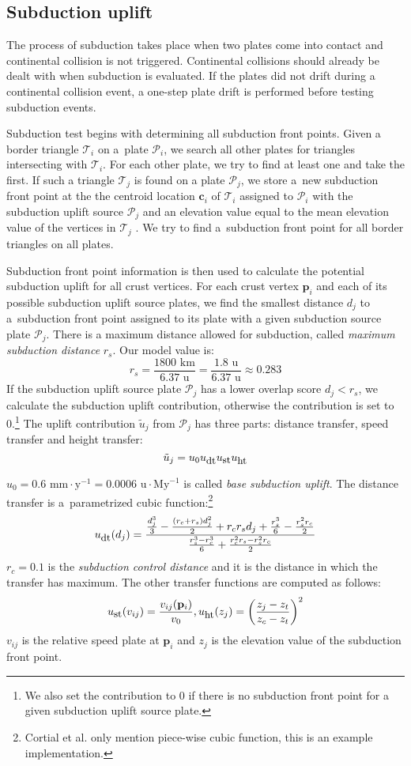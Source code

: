 \subsection{Subduction uplift}
The process of subduction takes place when two plates come into contact and continental collision is not triggered. Continental collisions should already be dealt with when subduction is evaluated. If the plates did not drift during a continental collision event, a one-step plate drift is performed before testing subduction events.

Subduction test begins with determining all subduction front points. Given a border triangle $\mathcal{T}_i$ on a~plate $\mathcal{P}_i$, we search all other plates for triangles intersecting with $\mathcal{T}_i$. For each other plate, we try to find at least one and take the first. If such a triangle $\mathcal{T}_j$ is found on a plate $\mathcal{P}_j$, we store a~new subduction front point at the the centroid location $\mathbf{c}_i$ of $\mathcal{T}_i$ assigned to $\mathcal{P}_i$ with the subduction uplift source $\mathcal{P}_j$ and an elevation value equal to the mean elevation value of the vertices in $\mathcal{T}_j$ . We try to find a~subduction front point for all border triangles on all plates.

Subduction front point information is then used to calculate the potential subduction uplift for all crust vertices. For each crust vertex $\mathbf{p}_i$ and each of its possible subduction uplift source plates, we find the smallest distance $d_j$ to a~subduction front point assigned to its plate with a given subduction source plate $\mathcal{P}_j$. There is a maximum distance allowed for subduction, called \textit{maximum subduction distance} $r_s$. Our model value is:
$$r_s=\frac{1800\mbox{ km}}{6.37\mbox{ u}}=\frac{1.8\mbox{ u}}{6.37\mbox{ u}}\approx0.283$$
If the subduction uplift source plate $\mathcal{P}_j$ has a lower overlap score $d_j<r_s$, we calculate the subduction uplift contribution, otherwise the contribution is set to 0.\footnote{We also set the contribution to 0 if there is no subduction front point for a given subduction uplift source plate.} The uplift contribution $\tilde{u}_j$ from $\mathcal{P}_j$ has three parts: distance transfer, speed transfer and height transfer:
$$ \tilde{u}_j=u_0 u_{\mbox{\small{dt}}}u_{\mbox{\small{st}}}u_{\mbox{\small{ht}}}$$

$u_0=0.6\mbox{ mm}\cdot\mbox{y}^{-1}=0.0006\mbox{ u}\cdot\mbox{My}^{-1}$ is called \textit{base subduction uplift}. The distance transfer is a~parametrized cubic function:\footnote{Cortial et al. only mention piece-wise cubic function, this is an example implementation.}
$$u_{\mbox{\small{dt}}}(d_j)=\frac{\frac{d_j^3}{3}-\frac{(r_c+r_s)d_j^2}{2}+r_cr_sd_j+\frac{r_s^3}{6}-\frac{r_s^2r_c}{2}}{\frac{r_s^3-r_c^3}{6}+\frac{r_c^2r_s-r_s^2r_c}{2}}$$
$r_c=0.1$ is the \textit{subduction control distance} and it is the distance in which the transfer has maximum. The other transfer functions are computed as follows:
$$u_{\mbox{\small{st}}}(v_{ij})=\frac{v_{ij}(\mathbf{p}_i)}{v_0},u_{\mbox{\small{ht}}}(z_j)=\left(\frac{z_j-z_t}{z_c-z_t}\right)^2$$
$v_{ij}$ is the relative speed plate at $\mathbf{p}_i$ and $z_j$ is the elevation value of the subduction front point.

